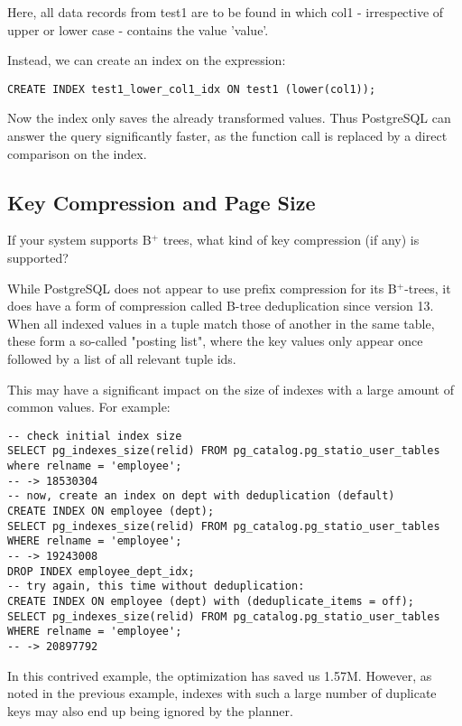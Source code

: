 \documentclass[11pt]{scrartcl}
\begin{document}
Here, all data records from test1 are to be found in which col1 - irrespective of upper or lower case - contains the value 'value'.

Instead, we can create an index on the expression:

\begin{lstlisting}[style=dbtsql]
CREATE INDEX test1_lower_col1_idx ON test1 (lower(col1));
\end{lstlisting}

Now the index only saves the already transformed values. Thus PostgreSQL can answer the query significantly faster, as the function call is replaced by a direct comparison on the index.

\subsection{Key Compression and Page Size}

If your system supports B$^+$ trees, what kind of key compression (if any) is supported?

While PostgreSQL does not appear to use prefix compression for its B$^+$-trees, it does have a form of compression called B-tree deduplication since version 13.  When all indexed values in a tuple match those of another in the same table, these form a so-called "posting list", where the key values only appear once followed by a list of all relevant tuple ids.

This may have a significant impact on the size of indexes with a large amount of common values.  For example:

\begin{lstlisting}[style=dbtsql]
-- check initial index size
SELECT pg_indexes_size(relid) FROM pg_catalog.pg_statio_user_tables where relname = 'employee';
-- -> 18530304
-- now, create an index on dept with deduplication (default)
CREATE INDEX ON employee (dept);
SELECT pg_indexes_size(relid) FROM pg_catalog.pg_statio_user_tables WHERE relname = 'employee';
-- -> 19243008
DROP INDEX employee_dept_idx;
-- try again, this time without deduplication:
CREATE INDEX ON employee (dept) with (deduplicate_items = off);
SELECT pg_indexes_size(relid) FROM pg_catalog.pg_statio_user_tables WHERE relname = 'employee';
-- -> 20897792
\end{lstlisting}

In this contrived example, the optimization has saved us 1.57M.  However, as noted in the previous example, indexes with such a large number of duplicate keys may also end up being ignored by the planner.
\end{document}
